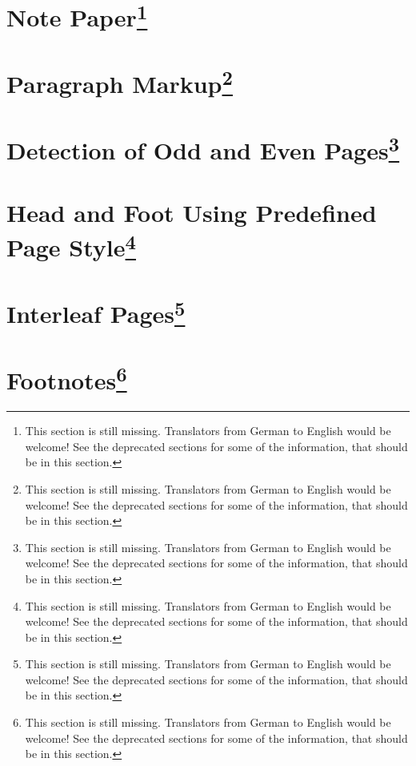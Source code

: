 \section{Note Paper\protect\footnote{This section is still missing. Translators
    from German to English would be welcome! See the deprecated sections for
    some of the information, that should be in this section.}}
\label{sec:scrlttr2.stillmissing}
\mbox{}

\section{Paragraph Markup\protect\footnote{This section is still missing. Translators
    from German to English would be welcome! See the deprecated sections for
    some of the information, that should be in this section.}}
\label{sec:scrlttr2.stillmissing}
\mbox{}

\section{Detection of Odd and Even Pages\protect\footnote{This section is still missing. Translators
    from German to English would be welcome! See the deprecated sections for
    some of the information, that should be in this section.}}
\label{sec:scrlttr2.stillmissing}
\mbox{}

\section{Head and Foot Using Predefined Page Style\protect\footnote{This section is still missing. Translators
    from German to English would be welcome! See the deprecated sections for
    some of the information, that should be in this section.}}
\label{sec:scrlttr2.stillmissing}
\mbox{}

\section{Interleaf Pages\protect\footnote{This section is still missing. Translators
    from German to English would be welcome! See the deprecated sections for
    some of the information, that should be in this section.}}
\label{sec:scrlttr2.stillmissing}
\mbox{}

\section{Footnotes\protect\footnote{This section is still missing. Translators
    from German to English would be welcome! See the deprecated sections for
    some of the information, that should be in this section.}}
\label{sec:scrlttr2.stillmissing}
\mbox{}

